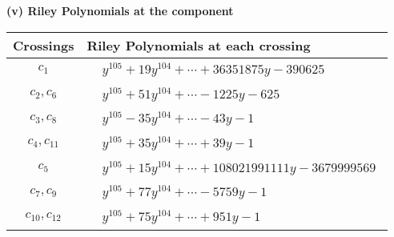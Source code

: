 \documentclass[1p]{elsarticle_modified}
\theoremstyle{definition}
\begin{document}
\flushleft \textbf{(v) Riley Polynomials at the component}\newline \\
\begin{tabular}{m{50pt}|m{274pt}}
Crossings & \hspace{64pt}Riley Polynomials at each crossing \\
\hline $$\begin{aligned}c_{1}\end{aligned}$$&$\begin{aligned}
&y^{105}+19 y^{104}+\cdots+36351875 y-390625
\end{aligned}$\\
\hline $$\begin{aligned}c_{2},c_{6}\end{aligned}$$&$\begin{aligned}
&y^{105}+51 y^{104}+\cdots-1225 y-625
\end{aligned}$\\
\hline $$\begin{aligned}c_{3},c_{8}\end{aligned}$$&$\begin{aligned}
&y^{105}-35 y^{104}+\cdots-43 y-1
\end{aligned}$\\
\hline $$\begin{aligned}c_{4},c_{11}\end{aligned}$$&$\begin{aligned}
&y^{105}+35 y^{104}+\cdots+39 y-1
\end{aligned}$\\
\hline $$\begin{aligned}c_{5}\end{aligned}$$&$\begin{aligned}
&y^{105}+15 y^{104}+\cdots+108021991111 y-3679999569
\end{aligned}$\\
\hline $$\begin{aligned}c_{7},c_{9}\end{aligned}$$&$\begin{aligned}
&y^{105}+77 y^{104}+\cdots-5759 y-1
\end{aligned}$\\
\hline $$\begin{aligned}c_{10},c_{12}\end{aligned}$$&$\begin{aligned}
&y^{105}+75 y^{104}+\cdots+951 y-1
\end{aligned}$\\
\hline
\end{tabular}\\~\\
\end{document}
